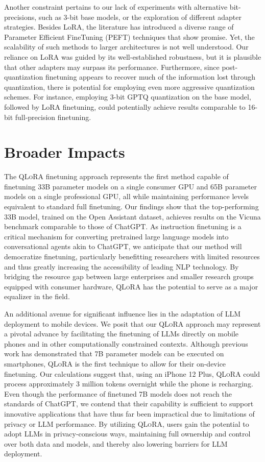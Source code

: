 Another constraint pertains to our lack of experiments with alternative bit-precisions, such as 3-bit base models, or the exploration of different adapter strategies. Besides LoRA, the literature has introduced a diverse range of Parameter Efficient FineTuning (PEFT) techniques that show promise. Yet, the scalability of such methods to larger architectures is not well understood. Our reliance on LoRA was guided by its well-established robustness, but it is plausible that other adapters may surpass its performance. Furthermore, since post-quantization finetuning appears to recover much of the information lost through quantization, there is potential for employing even more aggressive quantization schemes. For instance, employing 3-bit GPTQ quantization on the base model, followed by LoRA finetuning, could potentially achieve results comparable to 16-bit full-precision finetuning.

\section{Broader Impacts}

The \textsc{QLoRA} finetuning approach represents the first method capable of finetuning 33B parameter models on a single consumer GPU and 65B parameter models on a single professional GPU, all while maintaining performance levels equivalent to standard full finetuning. Our findings show that the top-performing 33B model, trained on the Open Assistant dataset, achieves results on the Vicuna benchmark comparable to those of ChatGPT. As instruction finetuning is a critical mechanism for converting pretrained large language models into conversational agents akin to ChatGPT, we anticipate that our method will democratize finetuning, particularly benefitting researchers with limited resources and thus greatly increasing the accessibility of leading NLP technology. By bridging the resource gap between large enterprises and smaller research groups equipped with consumer hardware, \textsc{QLoRA} has the potential to serve as a major equalizer in the field.

An additional avenue for significant influence lies in the adaptation of LLM deployment to mobile devices. We posit that our \textsc{QLoRA} approach may represent a pivotal advance by facilitating the finetuning of LLMs directly on mobile phones and in other computationally constrained contexts. Although previous work has demonstrated that 7B parameter models can be executed on smartphones, \textsc{QLoRA} is the first technique to allow for their on-device finetuning. Our calculations suggest that, using an iPhone 12 Plus, \textsc{QLoRA} could process approximately 3 million tokens overnight while the phone is recharging. Even though the performance of finetuned 7B models does not reach the standards of ChatGPT, we contend that their capability is sufficient to support innovative applications that have thus far been impractical due to limitations of privacy or LLM performance. By utilizing \textsc{QLoRA}, users gain the potential to adopt LLMs in privacy-conscious ways, maintaining full ownership and control over both data and models, and thereby also lowering barriers for LLM deployment.

